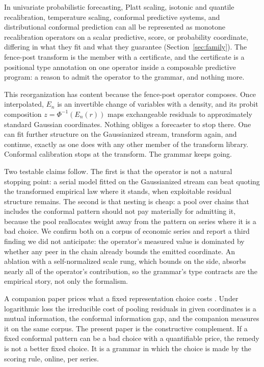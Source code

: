 \documentclass[11pt]{article}
\theoremstyle{remark}
\begin{document}
In univariate probabilistic forecasting, Platt scaling,
isotonic and quantile recalibration, temperature scaling, conformal predictive systems,
and distributional conformal prediction can all be represented as monotone recalibration
operators on a scalar predictive, score, or probability coordinate, differing in what
they fit and what they guarantee
(Section~\ref{sec:family}). The fence-post transform is the member with a certificate,
and the certificate is a positional type annotation on one operator inside a composable
predictive program: a reason to admit the operator to the grammar, and nothing more.

This reorganization has content because the fence-post operator composes. Once interpolated,
$E_n$ is an invertible change of variables with a density, and its probit composition
$z = \Phi^{-1}(E_n(r))$ maps exchangeable residuals to approximately standard Gaussian
coordinates. Nothing obliges a forecaster to stop there. One can fit further structure on
the Gaussianized stream, transform again, and continue, exactly as one does with any other
member of the transform library. Conformal calibration stops at the transform. The grammar
keeps going.

Two testable claims follow. The first is that the operator is not a natural stopping
point: a serial model fitted on the Gaussianized stream can beat quoting the
transformed empirical law where it stands, when exploitable residual structure
remains. The second is that nesting is
cheap: a pool over chains that includes the conformal pattern should not pay materially
for admitting it, because the pool reallocates weight away from the pattern on series
where it is a bad choice. We confirm both on a corpus of economic series and report a third
finding we did not anticipate: the operator's measured value is dominated by whether
any peer in the chain already bounds the emitted coordinate. An ablation with a
self-normalized scale rung, which bounds on the side, absorbs nearly all of the
operator's contribution, so the grammar's type contracts are the empirical story,
not only the formalism.

A companion paper prices what a fixed representation choice costs
\citep{cotton2026gap}. Under logarithmic loss the irreducible cost of pooling residuals in
given coordinates is a mutual information, the conformal information gap, and the companion
measures it on the same corpus. The present paper is the constructive complement. If a fixed
conformal pattern can be a bad choice with a quantifiable price, the remedy is not a better
fixed choice. It is a grammar in which the choice is made by the scoring rule, online,
per series.
\end{document}
